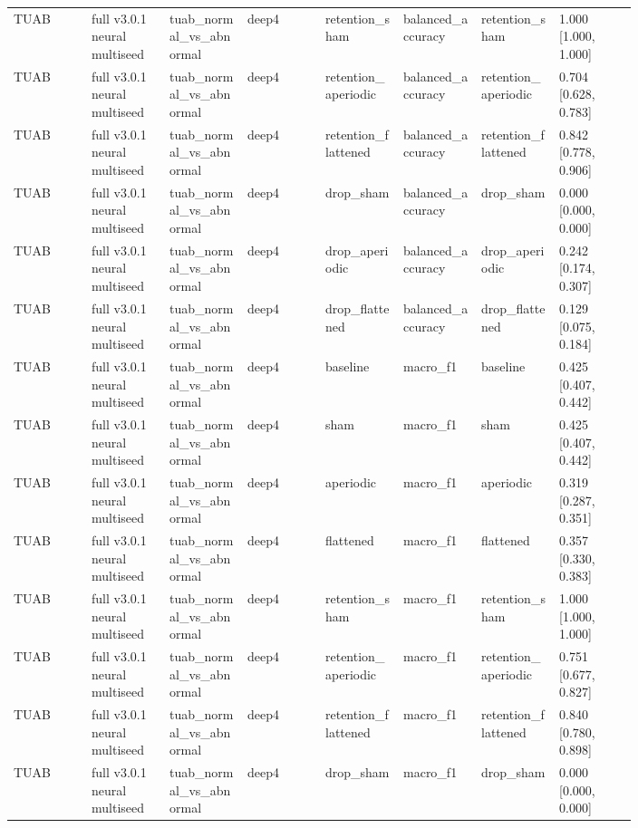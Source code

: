 \begin{longtable}{p{0.10\linewidth}p{0.10\linewidth}p{0.10\linewidth}p{0.10\linewidth}p{0.10\linewidth}p{0.10\linewidth}p{0.10\linewidth}p{0.10\linewidth}}
TUAB & full v3.0.1 neural multiseed & tuab\_normal\_vs\_abnormal & deep4 & retention\_sham & balanced\_accuracy & retention\_sham & 1.000 [1.000, 1.000]\\
TUAB & full v3.0.1 neural multiseed & tuab\_normal\_vs\_abnormal & deep4 & retention\_aperiodic & balanced\_accuracy & retention\_aperiodic & 0.704 [0.628, 0.783]\\
TUAB & full v3.0.1 neural multiseed & tuab\_normal\_vs\_abnormal & deep4 & retention\_flattened & balanced\_accuracy & retention\_flattened & 0.842 [0.778, 0.906]\\
TUAB & full v3.0.1 neural multiseed & tuab\_normal\_vs\_abnormal & deep4 & drop\_sham & balanced\_accuracy & drop\_sham & 0.000 [0.000, 0.000]\\
TUAB & full v3.0.1 neural multiseed & tuab\_normal\_vs\_abnormal & deep4 & drop\_aperiodic & balanced\_accuracy & drop\_aperiodic & 0.242 [0.174, 0.307]\\
TUAB & full v3.0.1 neural multiseed & tuab\_normal\_vs\_abnormal & deep4 & drop\_flattened & balanced\_accuracy & drop\_flattened & 0.129 [0.075, 0.184]\\
TUAB & full v3.0.1 neural multiseed & tuab\_normal\_vs\_abnormal & deep4 & baseline & macro\_f1 & baseline & 0.425 [0.407, 0.442]\\
TUAB & full v3.0.1 neural multiseed & tuab\_normal\_vs\_abnormal & deep4 & sham & macro\_f1 & sham & 0.425 [0.407, 0.442]\\
TUAB & full v3.0.1 neural multiseed & tuab\_normal\_vs\_abnormal & deep4 & aperiodic & macro\_f1 & aperiodic & 0.319 [0.287, 0.351]\\
TUAB & full v3.0.1 neural multiseed & tuab\_normal\_vs\_abnormal & deep4 & flattened & macro\_f1 & flattened & 0.357 [0.330, 0.383]\\
TUAB & full v3.0.1 neural multiseed & tuab\_normal\_vs\_abnormal & deep4 & retention\_sham & macro\_f1 & retention\_sham & 1.000 [1.000, 1.000]\\
TUAB & full v3.0.1 neural multiseed & tuab\_normal\_vs\_abnormal & deep4 & retention\_aperiodic & macro\_f1 & retention\_aperiodic & 0.751 [0.677, 0.827]\\
TUAB & full v3.0.1 neural multiseed & tuab\_normal\_vs\_abnormal & deep4 & retention\_flattened & macro\_f1 & retention\_flattened & 0.840 [0.780, 0.898]\\
TUAB & full v3.0.1 neural multiseed & tuab\_normal\_vs\_abnormal & deep4 & drop\_sham & macro\_f1 & drop\_sham & 0.000 [0.000, 0.000]\\

\end{longtable}
